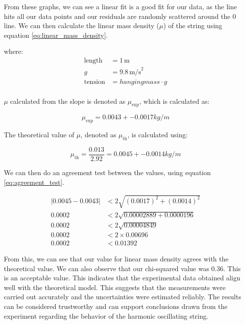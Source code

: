 \documentclass[11pt]{article}
\begin{document}
    From these graphs, we can see a linear fit is a good fit for our data, as the line hits all our data points and our residuals are randomly scattered around the 0 line.
    We can then calculate the linear mass density ($\mu$) of the string using equation \ref{eq:linear_mass_density}.
    
    where:
    \begin{align*}
    \text{length} &= 1 \, \text{m} \\
    g &= 9.8 \, \text{m/s}^2 \\
    \text{tension} &= hanging mass \cdot g\\
    \end{align*}
    
    $\mu$ calculated from the slope is denoted as $\mu_{\text{exp}}$, which is calculated as:
    
    \begin{equation}
    \mu_{\text{exp}} = 0.0043 +- 0.0017 kg/m
    \end{equation}
    
    The theoretical value of $\mu$, denoted as $\mu_{\text{th}}$, is calculated using:
    
    \begin{equation}
    \mu_{\text{th}} = \frac{0.013}{2.92} = 0.0045 +- 0.0014 kg/m
    \end{equation}

    We can then do an agreement test between the values, using equation \ref{eq:agreement_test}.

    \begin{align*}
    |0.0045 - 0.0043| &< 2 \sqrt{(0.0017)^2 + (0.0014)^2} \\
    0.0002 &< 2 \sqrt{0.00002889 + 0.0000196} \\
    0.0002 &< 2 \sqrt{0.00004849} \\
    0.0002 &< 2 \times 0.00696 \\
    0.0002 &< 0.01392
    \end{align*}

    From this, we can see that our value for linear mass density agrees with the theoretical value.
    We can also observe that our chi-squared value was 0.36.
    This is an acceptable value.
    This indicates that the experimental data obtained align well with the theoretical model.
    This suggests that the measurements were carried out accurately and the uncertainties were estimated reliably.
    The results can be considered trustworthy and can support conclusions drawn from the experiment regarding the behavior of the harmonic oscillating string.
\end{document}
